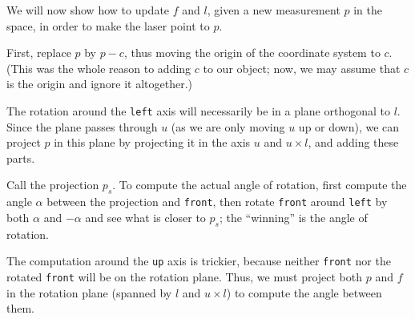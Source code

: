 \documentclass{article}
\begin{document}
We will now show how to update $f$ and $l$,
given a new measurement $p$ in the space,
in order to make the laser point to $p$.

First, replace $p$ by $p - c$,
thus moving the origin of the coordinate system to $c$.
(This was the whole reason to adding $c$ to our object;
now, we may assume that $c$ is the origin and ignore it altogether.)

The rotation around the \texttt{left} axis
will necessarily be in a plane orthogonal to $l$.
Since the plane passes through $u$
(as we are only moving $u$ up or down),
we can project $p$ in this plane
by projecting it in the axis $u$ and $u \times l$,
and adding these parts.

Call the projection $p_s$.
To compute the actual angle of rotation,
first compute the angle $\alpha$ between the projection and \texttt{front},
then rotate \texttt{front} around \texttt{left} by both $\alpha$ and $-\alpha$
and see what is closer to $p_s$;
the ``winning'' is the angle of rotation.

The computation around the \texttt{up} axis is trickier,
because neither \texttt{front} nor the rotated \texttt{front}
will be on the rotation plane.
Thus, we must project both $p$ and $f$ in the rotation plane
(spanned by $l$ and $u \times l$)
to compute the angle between them.
\end{document}
